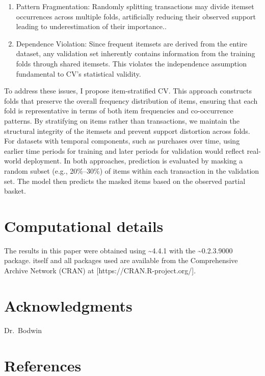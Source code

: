 \documentclass[
  article]{jss}
\begin{document}
\begin{enumerate}
\def\labelenumi{\arabic{enumi}.}
\item
  Pattern Fragmentation: Randomly splitting transactions may divide
  itemset occurrences across multiple folds, artificially reducing their
  observed support leading to underestimation of their importance..
\item
  Dependence Violation: Since frequent itemsets are derived from the
  entire dataset, any validation set inherently contains information
  from the training folds through shared itemsets. This violates the
  independence assumption fundamental to CV's statistical validity.
\end{enumerate}

To address these issues, I propose item-stratified CV. This approach
constructs folds that preserve the overall frequency distribution of
items, ensuring that each fold is representative in terms of both item
frequencies and co-occurrence patterns. By stratifying on items rather
than transactions, we maintain the structural integrity of the itemsets
and prevent support distortion across folds. For datasets with temporal
components, such as purchases over time, using earlier time periods for
training and later periods for validation would reflect real-world
deployment. In both approaches, prediction is evaluated by masking a
random subset (e.g., 20\%--30\%) of items within each transaction in the
validation set. The model then predicts the masked items based on the
observed partial basket.

\section*{Computational details}\label{computational-details}

The results in this paper were obtained using
\textasciitilde4.4.1 with the
\textasciitilde0.2.3.9000 package.  itself
and all packages used are available from the Comprehensive 
Archive Network (CRAN) at {[}https://CRAN.R-project.org/{]}.

\section*{Acknowledgments}\label{acknowledgments}

Dr.~Bodwin

\section*{References}\label{references}

\renewcommand{\bibsection}{}

\end{document}
